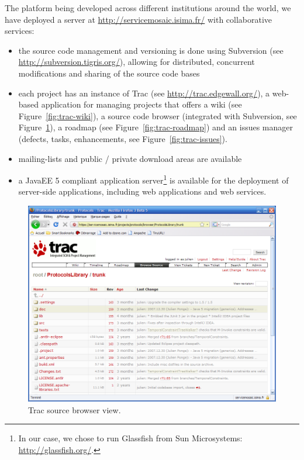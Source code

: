 The platform being developed across different institutions around the world, we have deployed a server at \url{http://servicemosaic.isima.fr/} with collaborative services:
\begin{itemize}
  
  \item the source code management and versioning is done using Subversion (see \url{http://subversion.tigris.org/}), allowing for distributed, concurrent modifications and sharing of the source code bases
  
  \item each project has an instance of Trac (see \url{http://trac.edgewall.org/}), a web-based application for managing projects that offers a wiki (see Figure~\ref{fig:trac-wiki}), a source code browser (integrated with Subversion, see Figure~\ref{fig:trac-svn}), a roadmap (see Figure~\ref{fig:trac-roadmap}) and an issues manager (defects, tasks, enhancements, see Figure~\ref{fig:trac-issues}).
  
  \item mailing-lists and public / private download areas are available
  
  \item a JavaEE 5 compliant application server\footnote{In our case, we chose to run Glassfish from Sun Microsystems: \url{http://glassfish.org/}.} is available for the deployment of server-side applications, including web applications and web services.
  
\end{itemize}

\begin{figure}[tbhp]
    \centering
    \includegraphics[width=\textwidth]{content/protocols-project/trac-svn}
    \caption{Trac source browser view.}
    \label{fig:trac-svn}
\end{figure}

